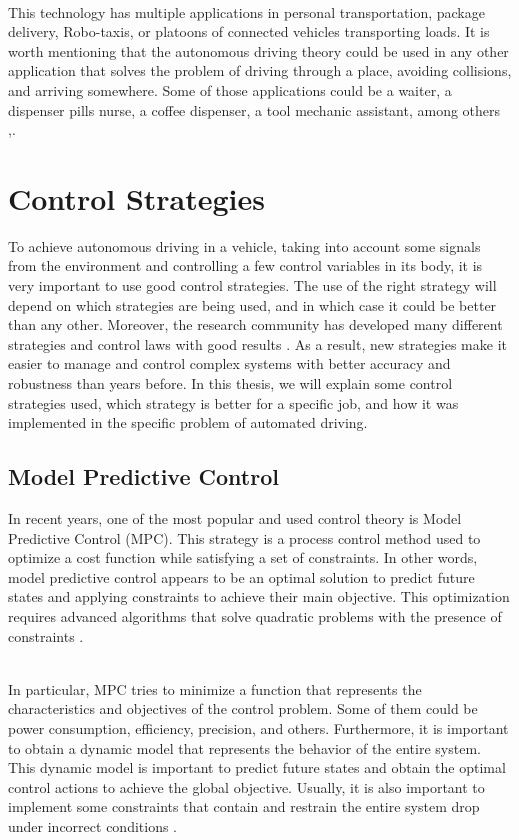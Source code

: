 \\
This technology has multiple applications in personal transportation, package delivery, Robo-taxis, or platoons of connected vehicles transporting loads. It is worth mentioning that the autonomous driving theory could be used in any other application that solves the problem of driving through a place, avoiding collisions, and arriving somewhere. Some of those applications could be a waiter, a dispenser pills nurse, a coffee dispenser, a tool mechanic assistant, among others \cite{8957499},\cite{peter}.


\section{Control Strategies}
To achieve autonomous driving in a vehicle, taking into account some signals from the environment and controlling a few control variables in its body, it is very important to use good control strategies. The use of the right strategy will depend on which strategies are being used, and in which case it could be better than any other. Moreover, the research community has developed many different strategies and control laws with good results \cite{506394}. As a result, new strategies make it easier to manage and control complex systems with better accuracy and robustness than years before. In this thesis, we will explain some control strategies used, which strategy is better for a specific job, and how it was implemented in the specific problem of automated driving.


\subsection{Model Predictive Control}
In recent years, one of the most popular and used control theory is Model Predictive Control (MPC). This strategy is a process control method used to optimize a cost function while satisfying a set of constraints. In other words, model predictive control appears to be an optimal solution to predict future states and applying constraints to achieve their main objective. This optimization requires advanced algorithms that solve quadratic problems with the presence of constraints \cite{GARCIA1989335}.

\\

In particular, MPC tries to minimize a function that represents the characteristics and objectives of the control problem. Some of them could be power consumption, efficiency, precision, and others. Furthermore, it is important to obtain a dynamic model that represents the behavior of the entire system. This dynamic model is important to predict future states and obtain the optimal control actions to achieve the global objective. Usually, it is also important to implement some constraints that contain and restrain the entire system drop under incorrect conditions \cite{MAYNE2000789}.
\\
\\


